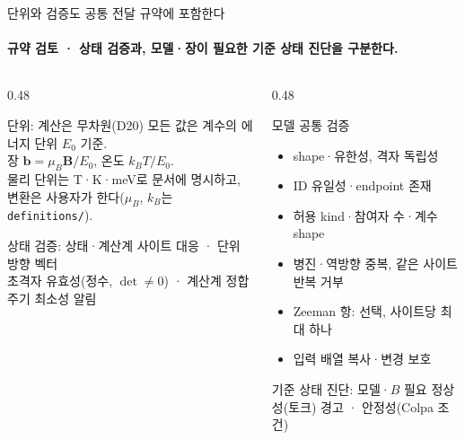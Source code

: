 \begin{frame}[label=validation]{단위와 검증도 공통 전달 규약에 포함한다}
  \framesubtitle{규약 검토 · 상태 검증과, 모델·장이 필요한 기준 상태 진단을 구분한다.}
  \begin{columns}[T,onlytextwidth]
    \begin{column}{0.48\textwidth}
      \begin{block}{단위: 계산은 무차원(D20)}
        모든 값은 계수의 에너지 단위 $E_0$ 기준.\\
        장 $\mathbf b=\mu_B\mathbf B/E_0$, 온도 $k_BT/E_0$.\\[0.4em]
        물리 단위는 T·K·meV로 문서에 명시하고,
        변환은 사용자가 한다($\mu_B$, $k_B$는 \texttt{definitions/}).
      \end{block}
      \begin{block}{상태 검증: 상태·계산계}
        사이트 대응 · 단위 방향 벡터\\
        초격자 유효성(정수, $\det\neq0$) · 계산계 정합\\
        주기 최소성 알림
      \end{block}
    \end{column}
    \begin{column}{0.48\textwidth}
      \begin{block}{모델 공통 검증}
        \begin{itemize}
          \item shape·유한성, 격자 독립성
          \item ID 유일성·endpoint 존재
          \item 허용 kind·참여자 수·계수 shape
          \item 병진·역방향 중복, 같은 사이트 반복 거부
          \item Zeeman 항: 선택, 사이트당 최대 하나
          \item 입력 배열 복사·변경 보호
        \end{itemize}
      \end{block}
      \begin{block}{기준 상태 진단: 모델·$B$ 필요}
        정상성(토크) 경고 · 안정성(Colpa 조건)
      \end{block}
    \end{column}
  \end{columns}
\end{frame}

